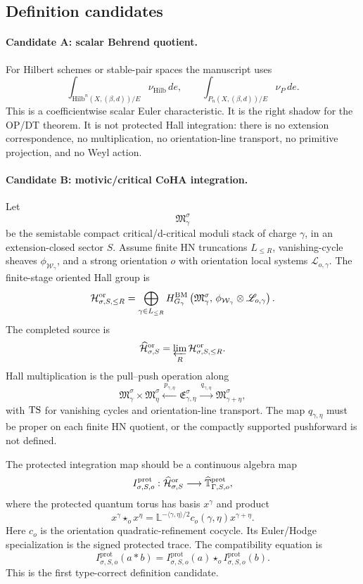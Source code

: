 \subsection{Definition candidates}

\paragraph{Candidate A: scalar Behrend quotient.}
For Hilbert schemes or stable-pair spaces the manuscript uses
\[
  \int_{\mathrm{Hilb}^n(X,(\beta,d))/E}\nu_{\mathrm{Hilb}}\,de,
  \qquad
  \int_{P_n(X,(\beta,d))/E}\nu_P\,de .
\]
This is a coefficientwise scalar Euler characteristic.  It is the right
shadow for the OP/DT theorem.  It is not protected Hall integration:
there is no extension correspondence, no multiplication, no
orientation-line transport, no primitive projection, and no Weyl action.

\paragraph{Candidate B: motivic/critical CoHA integration.}
Let
\[
  \mathfrak M^\sigma_\gamma
\]
be the semistable compact critical/d-critical moduli stack of charge
\(\gamma\), in an extension-closed sector \(S\).  Assume finite HN
truncations \(L_{\le R}\), vanishing-cycle sheaves
\(\phi_{\mathcal W_\gamma}\), and a strong orientation \(o\) with
orientation local systems \(\mathscr L_{o,\gamma}\).  The finite-stage
oriented Hall group is
\[
  \mathcal H^{\mathrm{or}}_{\sigma,S,\le R}
  =
  \bigoplus_{\gamma\in L_{\le R}}
  H^{\operatorname{BM}}_{G_\gamma}
  \left(
    \mathfrak M^\sigma_\gamma,\,
    \phi_{\mathcal W_\gamma}\otimes\mathscr L_{o,\gamma}
  \right).
\]
The completed source is
\[
  \widehat{\mathcal H}^{\mathrm{or}}_{\sigma,S}
  =
  \varprojlim_R \mathcal H^{\mathrm{or}}_{\sigma,S,\le R}.
\]
Hall multiplication is the pull--push operation along
\[
  \mathfrak M^\sigma_\gamma\times\mathfrak M^\sigma_\eta
  \xleftarrow{\ p_{\gamma,\eta}\ }
  \mathfrak E^\sigma_{\gamma,\eta}
  \xrightarrow{\ q_{\gamma,\eta}\ }
  \mathfrak M^\sigma_{\gamma+\eta},
\]
with \(\mathrm{TS}\) for vanishing cycles and orientation-line transport.
The map \(q_{\gamma,\eta}\) must be proper on each finite HN quotient,
or the compactly supported pushforward is not defined.

The protected integration map should be a continuous algebra map
\[
  I^{\mathrm{prot}}_{\sigma,S,o}:
  \widehat{\mathcal H}^{\mathrm{or}}_{\sigma,S}
  \longrightarrow
  \widehat{\mathbb T}^{\mathrm{prot}}_{\Gamma,S,o},
\]
where the protected quantum torus has basis \(x^\gamma\) and product
\[
  x^\gamma\star_o x^\eta
  =
  \mathbb L^{-\langle\gamma,\eta\rangle/2}
  c_o(\gamma,\eta)x^{\gamma+\eta}.
\]
Here \(c_o\) is the orientation quadratic-refinement cocycle.  Its
Euler/Hodge specialization is the signed protected trace.  The
compatibility equation is
\[
  I^{\mathrm{prot}}_{\sigma,S,o}(a*b)
  =
  I^{\mathrm{prot}}_{\sigma,S,o}(a)\star_o
  I^{\mathrm{prot}}_{\sigma,S,o}(b).
\]
This is the first type-correct definition candidate.

